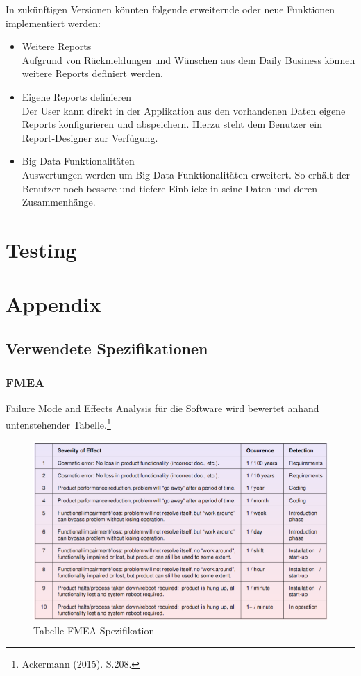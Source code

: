 \documentclass[a4paper]{scrreprt}
\begin{document}
In zukünftigen Versionen könnten folgende erweiternde oder neue Funktionen implementiert werden:
\begin{itemize}
\item Weitere Reports\\
Aufgrund von Rückmeldungen und Wünschen aus dem Daily Business können weitere Reports definiert werden.
\item Eigene Reports definieren\\
Der User kann direkt in der Applikation aus den vorhandenen Daten eigene Reports konfigurieren und abspeichern. Hierzu steht dem Benutzer ein Report-Designer zur Verfügung.
\item Big Data Funktionalitäten \\
Auswertungen werden um Big Data Funktionalitäten erweitert. So erhält der Benutzer noch bessere und tiefere Einblicke in seine Daten und deren Zusammenhänge.
\end{itemize}


\chapter{Testing}



\chapter{Appendix}

\section{Verwendete Spezifikationen}
\subsection{FMEA}
Failure Mode and Effects Analysis für die Software wird bewertet anhand untenstehender Tabelle.\footnote{Ackermann (2015). S.208.}


\begin{figure}[htbp]
\includegraphics[width=1\textwidth]{img/fmea.png}
\caption[Tabelle FMEA Spezifikation]{Tabelle FMEA Spezifikation}
\end{figure}
\end{document}
